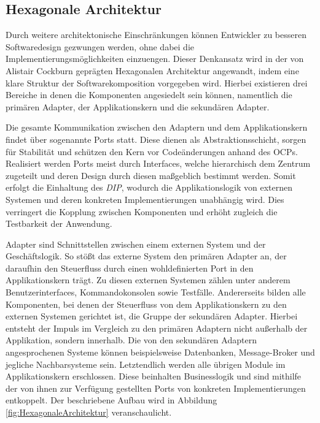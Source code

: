 \subsection{Hexagonale Architektur}

Durch weitere architektonische Einschränkungen können Entwickler zu besseren Softwaredesign gezwungen werden, ohne dabei die Implementierungsmöglichkeiten einzuengen. Dieser Denkansatz wird in der von Alistair Cockburn geprägten Hexagonalen Architektur angewandt, indem eine klare Struktur der Softwarekomposition vorgegeben wird. Hierbei existieren drei Bereiche in denen die Komponenten angesiedelt sein können, namentlich die primären Adapter, der Applikationskern und die sekundären Adapter. \cite{Cockburn.Hexagonal}  

Die gesamte Kommunikation zwischen den Adaptern und dem Applikationskern findet über sogenannte Ports statt. Diese dienen als Abstraktionsschicht, sorgen für Stabilität und schützen den Kern vor Codeänderungen anhand des \acrlong{OCP}s. Realisiert werden Ports meist durch Interfaces, welche hierarchisch dem Zentrum zugeteilt und deren Design durch diesen maßgeblich bestimmt werden. Somit erfolgt die Einhaltung des \emph{\acrlong{DIP}}, wodurch die Applikationslogik von externen Systemen und deren konkreten Implementierungen unabhängig wird. Dies verringert die Kopplung zwischen Komponenten und erhöht zugleich die Testbarkeit der Anwendung. \cite{philipbrown.2014}

Adapter sind Schnittstellen zwischen einem externen System und der Geschäftslogik. So stößt das externe System den primären Adapter an, der daraufhin den Steuerfluss durch einen wohldefinierten Port in den Applikationskern trägt. Zu diesen externen Systemen zählen unter anderem Benutzerinterfaces, Kommandokonsolen sowie Testfälle. Andererseits bilden alle Komponenten, bei denen der Steuerfluss von dem Applikationskern zu den externen Systemen gerichtet ist, die Gruppe der sekundären Adapter. Hierbei entsteht der Impuls im Vergleich zu den primären Adaptern nicht außerhalb der Applikation, sondern innerhalb. Die von den sekundären Adaptern angesprochenen Systeme können beispielsweise Datenbanken, Message-Broker und jegliche Nachbarsysteme sein. Letztendlich werden alle übrigen Module im Applikationskern erschlossen. Diese beinhalten Businesslogik und sind mithilfe der von ihnen zur Verfügung gestellten Ports von konkreten Implementierungen entkoppelt. \cite{hgraca.2017, Griffin.2021b} Der beschriebene Aufbau wird in Abbildung \ref{fig:HexagonaleArchitektur} veranschaulicht. 

